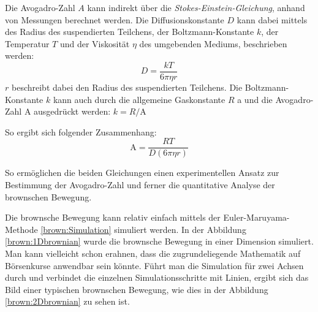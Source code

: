 Die Avogadro-Zahl $ A $ kann indirekt über die \textit{Stokes-Einstein-Gleichung}, anhand von Messungen berechnet werden. Die Diffusionskonstante $ D $ kann dabei mittels des Radius des suspendierten Teilchens, der Boltzmann-Konstante  $ k $, der Temperatur $ T $ und der Viskosität $ \eta $ des umgebenden Mediums, beschrieben werden:
\begin{equation}
	D = \frac{kT}{6\pi\eta r}
\end{equation}
$ r $ beschreibt dabei den Radius des suspendierten Teilchens. Die Boltzmann-Konstante $ k $ kann auch durch die allgemeine Gaskonstante $ R $ a und die Avogadro-Zahl $ \mathrm{A} $ ausgedrückt werden: $ k = R/\mathrm{A} $

So ergibt sich folgender Zusammenhang:
\begin{equation}
	\mathrm{A} = \frac{R T}{D (6 \pi \eta r)}
\end{equation}

So ermöglichen die beiden Gleichungen einen experimentellen Ansatz zur Bestimmung der Avogadro-Zahl und ferner die quantitative Analyse der brownschen Bewegung.



Die brownsche Bewegung kann relativ einfach mittels der Euler-Maruyama-Methode \ref{brown:Simulation} simuliert werden.
In der Abbildung \ref{brown:1Dbrownian} wurde die brownsche Bewegung in einer Dimension simuliert. Man kann vielleicht schon erahnen, dass die zugrundeliegende Mathematik auf Börsenkurse anwendbar sein könnte. Führt man die Simulation für zwei Achsen durch und verbindet die einzelnen Simulationsschritte mit Linien, ergibt sich das Bild einer typischen brownschen Bewegung, wie dies in der Abbildung \ref{brown:2Dbrownian} zu sehen ist.

